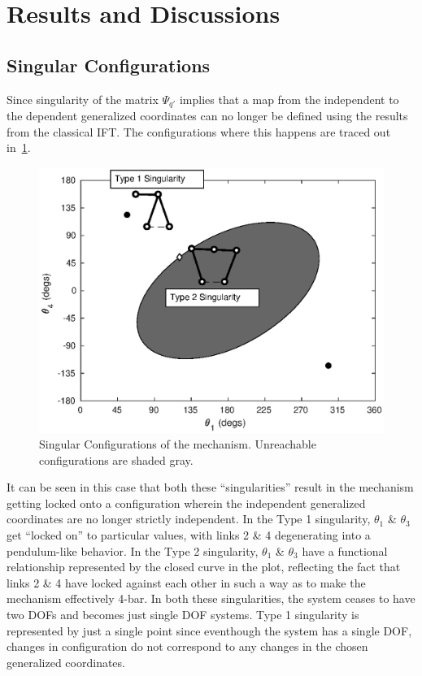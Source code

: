 \documentclass[10pt,final,journal,letterpaper,oneside,twocolumn]{IEEEtran}
\begin{document}
\section{Results and Discussions}
\label{sec:results-discussions}

\subsection{Singular Configurations}
\label{sec:sing-conf}

Since singularity of the matrix $\Psi_{q'}$ implies that a map from
the independent to the dependent generalized coordinates can no longer
be defined using the results from the classical IFT. The
configurations where this happens are traced out
in~\cref{fig:sing5}.

\begin{figure}[!h]
  \centering
  \includegraphics[width=\linewidth]{FIGS/SING5}
  \caption{Singular Configurations of the mechanism. Unreachable
    configurations are shaded gray.}
  \label{fig:sing5}
\end{figure}

It can be seen in this case that both these ``singularities'' result
in the mechanism getting locked onto a configuration wherein the
independent generalized coordinates are no longer strictly
independent. In the Type 1 singularity, $\theta_1$ \& $\theta_3$ get
``locked on'' to particular values, with links 2 \& 4 degenerating
into a pendulum-like behavior. In the Type 2 singularity, $\theta_1$
\& $\theta_3$ have a functional relationship represented by the closed
curve in the plot, reflecting the fact that links 2 \& 4 have locked
against each other in such a way as to make the mechanism effectively
4-bar. In both these singularities, the system ceases to have two DOFs
and becomes just single DOF systems. Type 1 singularity is represented
by just a single point since eventhough the system has a single DOF,
changes in configuration do not correspond to any changes in the
chosen generalized coordinates.
\end{document}
